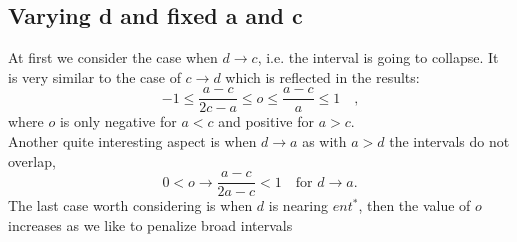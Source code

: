 \documentclass[a4paper]{article}
\begin{document}
\subsection{Varying d and fixed a and c}
At first we consider the case when $d \to c$, i.e. the interval is going to collapse. It is very similar to the case of $c \to d$ which is reflected in the results:
\begin{displaymath}
-1 \leq \frac{a-c}{2c-a} \leq o \leq \frac{a-c}{a} \leq 1 \quad \textrm{,}
\end{displaymath}
where $o$ is only negative for $a<c$ and positive for $a > c$.\\

Another quite interesting aspect is when $d \to a$ as with $a>d$ the intervals do not overlap,
\begin{displaymath}
0 < o \to \frac{a-c}{2a-c} < 1 \quad \textrm{for } d \to a \textrm{.}
\end{displaymath} 
The last case worth considering is when $d$ is nearing $ent^*$, then the value of $o$ increases as we like to penalize broad intervals
\end{document}
